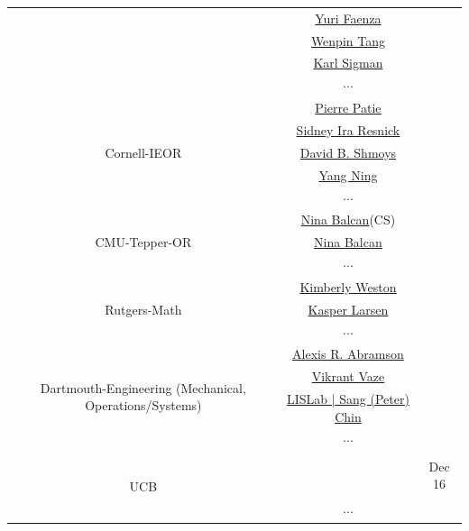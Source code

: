 \documentclass{article}
\begin{document}
\begin{table}[ht]
\begin{tabular}{|c|c|c|}
        &\href{http://www.columbia.edu/~yf2414/research.html}{Yuri Faenza}  & \\
        & \href{https://ieor.columbia.edu/content/wenpin-tang}{Wenpin Tang}  & \\
        & \href{https://ieor.columbia.edu/content/karl-sigman}{Karl Sigman}  & \\
        & $\cdots$& \\
        \bottomrule
        \toprule
        \multirow{5}{10em}{Cornell-IEOR }
        & \href{https://www.orie.cornell.edu/faculty-directory/pierre-patie}{Pierre Patie}  & \\
        & \href{https://www.engineering.cornell.edu/faculty-directory/sidney-ira-resnick}{Sidney Ira Resnick}  & \\
        & \href{https://www.engineering.cornell.edu/faculty-directory/david-b-shmoys}{David B. Shmoys}& \\
        & \href{https://stat.cornell.edu/people/faculty/yang-ning}{Yang Ning}  & \\
        & $\cdots$ & \\
        \bottomrule
        \toprule
        \multirow{3}{10em}{CMU-Tepper-OR }
        & \href{https://scholars.cmu.edu/3225-nina-balcan}{Nina Balcan}(CS) & \\
        & \href{https://scholars.cmu.edu/3225-nina-balcan}{Nina Balcan}  & \\
        & $\cdots$ & \\
        \bottomrule
        \toprule
        \multirow{3}{10em}{Rutgers-Math}
        & \href{https://sites.google.com/view/kimweston/home}{Kimberly Weston } & \\
        & \href{https://finmath.rutgers.edu/people-finmath/faculty-finmath/faculty-profile/883-larsen-kasper}{Kasper Larsen}& \\
        &$\cdots$& \\
        \bottomrule
        \toprule
        \multirow{4}{10em}{Dartmouth-Engineering
        (Mechanical, Operations/Systems)}
        &\href{https://engineering.dartmouth.edu/community/faculty/alexis-abramson}{Alexis R. Abramson} & \\
        &\href{https://engineering.dartmouth.edu/community/faculty/vikrant-vaze}{Vikrant Vaze}& \\
        &\href{https://lisplab.host.dartmouth.edu/}{LISLab | Sang (Peter) Chin}& \\
        &$\cdots$&\\
        \bottomrule
        \toprule
        \multirow{4}{10em}{UCB}
        &\href{}{}& \\
        &\href{}{} & Dec 16 \\
        &\href{}{} &\\
        &$\cdots$&\\
        \bottomrule
    \end{tabular}
\end{table}
\end{document}
